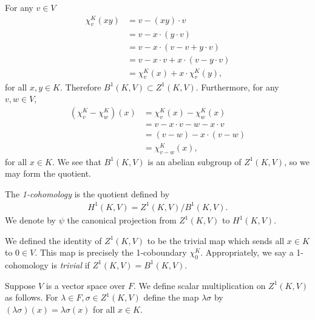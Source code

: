 For any $v \in V$
\begin{align*}
	\chi^K_v(xy) &=  v - (xy)\cdot v \\
	&=  v - x \cdot \left(y\cdot v \right)\\
	&=  v - x \cdot \left(v -v + y\cdot v \right)\\
	&=  v - x\cdot v + x\cdot \left( v - y\cdot v\right)\\
	&=  \chi^K_v(x) + x\cdot \chi^K_v(y),
\end{align*}
for all $x, y \in K$. Therefore $B^1(K, V) \subset Z^1(K, V)$.
Furthermore, for any $v, w \in V$,
\begin{align*}
	(\chi^K_v - \chi^K_w)(x) &=  \chi^K_v(x) - \chi^K_w(x)\\
	&=  v - x \cdot v - w - x\cdot v \\
	&=  (v - w) - x\cdot (v - w) \\
	&=  \chi^K_{v - w} (x),
\end{align*}
for all $x \in K$. We see that $B^1\left(K, V\right)$ is an abelian subgroup of $Z^1(K, V)$, so we may form the quotient.
\begin{definition} The \emph{1-cohomology} is the quotient defined by
\begin{align*}
	H^1\left(K, V\right) = Z^1\left(K, V\right) / B^1\left(K, V\right).
\end{align*}
We denote by $\psi$ the canonical projection from $Z^1(K, V)$ to $H^1(K, V)$.
\end{definition}

\begin{remark}\label{identity}
	We defined the identity of $Z^1(K, V)$ to be the trivial map which sends all $x \in K$ to $0 \in V$. This map is precisely the 1-coboundary $\chi^K_0$. Appropriately, we say a 1-cohomology is \emph{trivial} if $Z^1(K, V) = B^1(K, V)$.
\end{remark}

\begin{definition} Suppose $V$ is a vector space over $F$. We define scalar multiplication on $Z^1(K, V)$ as follows. 
For $\lambda \in F, \sigma \in Z^1(K, V)$ define the map $\lambda\sigma$ by $(\lambda\sigma)(x) = \lambda\sigma(x)$ for all $x \in K$.
\end{definition}

